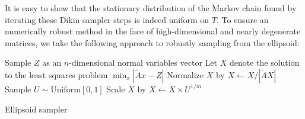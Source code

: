 It is easy to show that the stationary distribution of the Markov chain found by iterating these Dikin sampler steps is indeed uniform on $T$.  To ensure an numerically robust method in the face of high-dimensional and nearly degenerate matrices, we take the following approach to robustly sampling from the ellipsoid:

\begin{algorithm}[H]
 \vspace{.1in}
  Sample $Z$ as an $n$-dimensional normal variables vector\;
  Let $X$ denote the solution to the least squares problem $\min_x|\tilde Ax - Z|$\;
  Normalize $X$ by $X \gets X/|\tilde AX|$\;
  Sample $U \sim \mathrm{Uniform}[0,1]$\;
  Scale $X$ by $X \gets X \times U^{1/m}$\;
 \caption{Ellipsoid sampler}
\end{algorithm}









































